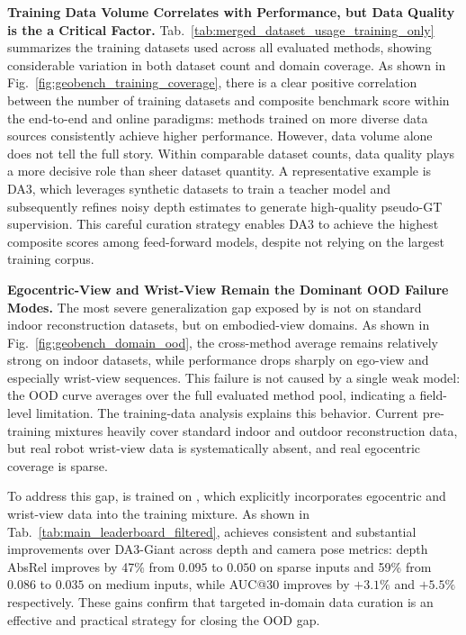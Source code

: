 \noindent\textbf{Training Data Volume Correlates with Performance, but Data Quality is the a Critical Factor.}
Tab.~\ref{tab:merged_dataset_usage_training_only} summarizes the training datasets used across all evaluated methods, showing considerable variation in both dataset count and domain coverage.
%
As shown in Fig.~\ref{fig:geobench_training_coverage}, there is a clear positive correlation between the number of training datasets and composite benchmark score within the end-to-end and online paradigms: methods trained on more diverse data sources consistently achieve higher performance.
%
However, data volume alone does not tell the full story.
%
Within comparable dataset counts, data quality plays a more decisive role than sheer dataset quantity.
%
A representative example is DA3, which leverages synthetic datasets to train a teacher model and subsequently refines noisy depth estimates to generate high-quality pseudo-GT supervision. 
%
This careful curation strategy enables DA3 to achieve the highest composite scores among feed-forward models, despite not relying on the largest training corpus.
%

\noindent\textbf{Egocentric-View and Wrist-View Remain the Dominant OOD Failure Modes.}
The most severe generalization gap exposed by \benchmark is not on standard indoor reconstruction datasets, but on embodied-view domains.
%
As shown in Fig.~\ref{fig:geobench_domain_ood}, the cross-method average remains relatively strong on indoor datasets, while performance drops sharply on ego-view and especially wrist-view sequences.
%
This failure is not caused by a single weak model: the OOD curve averages over the full evaluated method pool, indicating a field-level limitation.
%
The training-data analysis explains this behavior.
%
Current pre-training mixtures heavily cover standard indoor and outdoor reconstruction data, but real robot wrist-view data is systematically absent, and real egocentric coverage is sparse.

To address this gap, \ours is trained on \dataset, which explicitly incorporates egocentric and wrist-view data into the training mixture.
%
As shown in Tab.~\ref{tab:main_leaderboard_filtered}, \ours achieves consistent and substantial improvements over DA3-Giant across depth and camera pose metrics: depth AbsRel improves by 47\% from $0.095$ to $0.050$ on sparse inputs and 59\% from $0.086$ to $0.035$ on medium inputs, while AUC@30 improves by $+3.1\%$ and $+5.5\%$ respectively.
%
These gains confirm that targeted in-domain data curation is an effective and practical strategy for closing the OOD gap.

